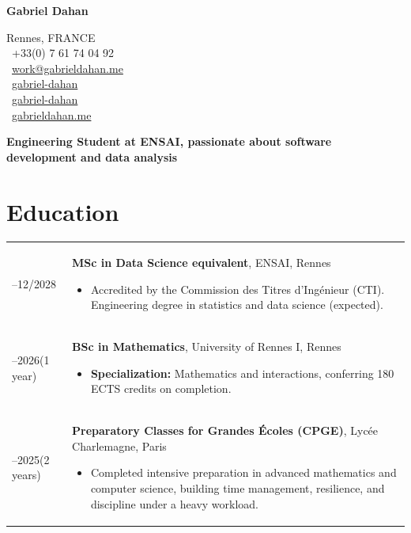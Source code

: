 \documentclass[11pt,a4paper]{article}
\begin{document}
\begin{minipage}[b]{0.6\textwidth}
    {\Huge \textbf{Gabriel Dahan}}
\end{minipage}
\hfill
\begin{minipage}[b]{0.35\textwidth}
    \raggedleft \small
    Rennes, FRANCE \\
    \faPhone \ +33(0) 7 61 74 04 92 \\
    \faEnvelope \ \href{mailto:work@gabrieldahan.me}{work@gabrieldahan.me} \\
    \faLinkedin \ \href{https://www.linkedin.com/in/gabriel-dahan/}{gabriel-dahan} \\
    \faGithub \ \href{https://github.com/gabriel-dahan}{gabriel-dahan} \\
    \faGlobe \ \href{https://gabrieldahan.me/}{gabrieldahan.me}
\end{minipage}

\vspace{0.4cm}

\textbf{Engineering Student at ENSAI, passionate about software development and data analysis}

\vspace{0.25cm}

\section*{Education}

\begin{tabularx}{\textwidth}{@{}>{\raggedright\arraybackslash}p{3.15cm} X@{}}
2025--12/2028 & \textbf{MSc in Data Science equivalent}, ENSAI, Rennes
  \begin{itemize}[leftmargin=0.4cm, nosep, topsep=1pt]
    \item Accredited by the Commission des Titres d'Ingénieur (CTI). Engineering degree in statistics and data science (expected).
  \end{itemize} \\[0.45em]

2025--2026\newline (1 year) & \textbf{BSc in Mathematics}, University of Rennes I, Rennes
  \begin{itemize}[leftmargin=0.4cm, nosep, topsep=1pt]
    \item \textbf{Specialization:} Mathematics and interactions, conferring 180 ECTS credits on completion.
  \end{itemize} \\[0.45em]

2023--2025\newline (2 years) & \textbf{Preparatory Classes for Grandes Écoles (CPGE)}, Lycée Charlemagne, Paris
  \begin{itemize}[leftmargin=0.4cm, nosep, topsep=1pt]
    \item Completed intensive preparation in advanced mathematics and computer science, building time management, resilience, and discipline under a heavy workload.
  \end{itemize}
\end{tabularx}
\end{document}
